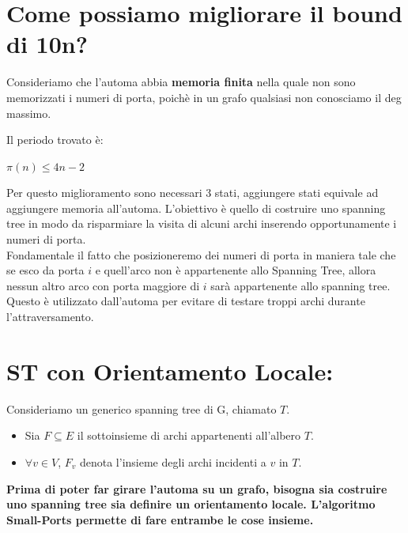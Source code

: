 \section{Come possiamo migliorare il bound di 10n?}
Consideriamo che l'automa abbia \textbf{memoria finita} nella quale non sono memorizzati i numeri di porta, poichè in un grafo qualsiasi non conosciamo il deg massimo.

Il periodo trovato è:
\begin{center}
 $\pi(n) \leq 4n-2$ 
\end{center}
Per questo miglioramento sono necessari 3 stati, aggiungere stati equivale ad aggiungere memoria all'automa. L'obiettivo è quello di costruire uno spanning tree in modo da risparmiare la visita di alcuni archi inserendo opportunamente i numeri di porta. \\
Fondamentale il fatto che posizioneremo dei numeri di porta in maniera tale che se esco da porta $i$ e quell'arco non è appartenente allo Spanning Tree, allora nessun altro arco con porta maggiore di $i$ sarà appartenente allo spanning tree. Questo è utilizzato dall'automa per evitare di testare troppi archi durante l'attraversamento.

\section{ST con Orientamento Locale:}
Consideriamo un generico spanning tree di G, chiamato $T$.
\begin{itemize}
    \item Sia $F \subseteq E$ il sottoinsieme di archi appartenenti all'albero $T$.
    \item $\forall v \in V$, $F_v$ denota l'insieme degli archi incidenti a $v$ in $T$.
\end{itemize}

 \textbf{Prima di poter far girare l'automa su un grafo, bisogna sia costruire uno spanning tree sia definire un orientamento locale. L'algoritmo Small-Ports permette di fare entrambe le cose insieme.}

